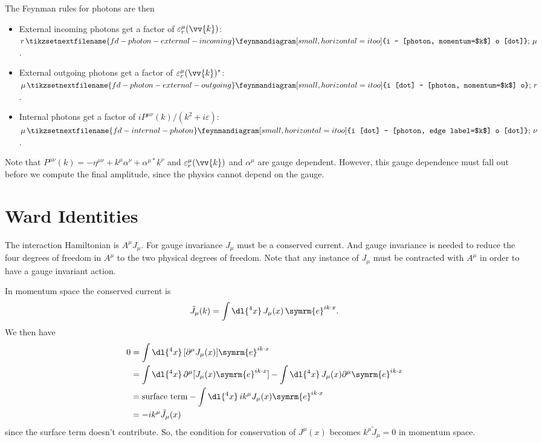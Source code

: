 \documentclass[fleqn]{NotesClass}
\newcommand{\minkowskiMetric}{\eta}
\newcommand{\e}{\symrm{e}}
\begin{document}
    The Feynman rules for photons are then
    \begin{itemize}
        \item External incoming photons get a factor of \(\varepsilon_r^\mu(\vv{k})\): \(r \, \tikzsetnextfilename{fd-photon-external-incoming} \feynmandiagram[small, horizontal=i to o]{i -- [photon, momentum=$k$] o [dot]}; \, \mu\).
        \item External outgoing photons get a factor of \(\varepsilon_r^\mu(\vv{k})^*\): \(\mu \, \tikzsetnextfilename{fd-photon-external-outgoing} \feynmandiagram[small, horizontal=i to o]{i [dot] -- [photon, momentum=$k$] o}; \, r\).
        \item Internal photons get a factor of \(iP^{\mu\nu}(k)/(k^2 + i\varepsilon)\): \(\mu \, \tikzsetnextfilename{fd-internal-photon} \feynmandiagram[small, horizontal=i to o]{i [dot] -- [photon, edge label=$k$] o [dot]}; \, \nu\).
    \end{itemize}
    Note that \(P^{\mu\nu}(k) = -\minkowskiMetric^{\mu\nu} + k^\mu \alpha^\nu + \alpha^{\mu*}k^\nu\) and \(\varepsilon_r^\mu(\vv{k})\) and \(\alpha^\mu\) are gauge dependent.
    However, this gauge dependence must fall out before we compute the final amplitude, since the physics cannot depend on the gauge.
    
    \section{Ward Identities}
    The interaction Hamiltonian is \(A^\mu J_\mu\).
    For gauge invariance \(J_\mu\) must be a conserved current.
    And gauge invariance is needed to reduce the four degrees of freedom in \(A^\mu\) to the two physical degrees of freedom.
    Note that any instance of \(J_\mu\) must be contracted with \(A^\mu\) in order to have a gauge invariant action.
    
    In momentum space the conserved current is
    \begin{equation}
        \tilde{J}_\mu(k) = \int \dl{^4x} \, J_\mu(x) \, \e^{ik \cdot x}.
    \end{equation}
    We then have
    \begin{align}
        0 &= \int \dl{^4x} \, [\partial^\mu J_\mu(x)] \e^{ik \cdot x}\\
        &= \int \dl{^4x} \, \partial^\mu [J_\mu(x) \e^{ik \cdot x}] - \int \dl{^4x} \, J_\mu(x) \partial^\mu \e^{ik \cdot x}\\
        &= \text{surface term} - \int \dl{^4x} \, ik^\mu J_\mu(x) \e^{ik\cdot x}\\
        &= -ik^\mu \tilde{J}_\mu(x)
    \end{align}
    since the surface term doesn't contribute.
    So, the condition for conservation of \(J^\mu(x)\) becomes \(k^\mu\tilde{J}_\mu = 0\) in momentum space.
    
\end{document}
